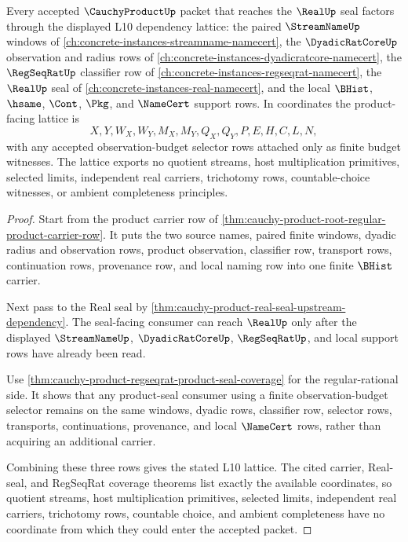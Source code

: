 \begin{theorem}
\label{thm:cauchy-product-l10-dependency-lattice}
Every accepted $\CauchyProductUp$ packet that reaches the $\RealUp$ seal factors through the displayed L10 dependency lattice: the paired $\StreamNameUp$ windows of \autoref{ch:concrete-instances-streamname-namecert}, the $\DyadicRatCoreUp$ observation and radius rows of \autoref{ch:concrete-instances-dyadicratcore-namecert}, the $\RegSeqRatUp$ classifier row of \autoref{ch:concrete-instances-regseqrat-namecert}, the $\RealUp$ seal of \autoref{ch:concrete-instances-real-namecert}, and the local $\BHist$, $\hsame$, $\Cont$, $\Pkg$, and $\NameCert$ support rows. In coordinates the product-facing lattice is
$$
X,Y,W_X,W_Y,M_X,M_Y,Q_X,Q_Y,P,E,H,C,L,N,
$$
with any accepted observation-budget selector rows attached only as finite budget witnesses. The lattice exports no quotient streams, host multiplication primitives, selected limits, independent real carriers, trichotomy rows, countable-choice witnesses, or ambient completeness principles.
\end{theorem}
\begin{proof}
Start from the product carrier row of \autoref{thm:cauchy-product-root-regular-product-carrier-row}. It puts the two source names, paired finite windows, dyadic radius and observation rows, product observation, classifier row, transport rows, continuation rows, provenance row, and local naming row into one finite $\BHist$ carrier.

Next pass to the Real seal by \autoref{thm:cauchy-product-real-seal-upstream-dependency}. The seal-facing consumer can reach $\RealUp$ only after the displayed $\StreamNameUp$, $\DyadicRatCoreUp$, $\RegSeqRatUp$, and local support rows have already been read.

Use \autoref{thm:cauchy-product-regseqrat-product-seal-coverage} for the regular-rational side. It shows that any product-seal consumer using a finite observation-budget selector remains on the same windows, dyadic rows, classifier row, selector rows, transports, continuations, provenance, and local $\NameCert$ rows, rather than acquiring an additional carrier.

Combining these three rows gives the stated L10 lattice. The cited carrier, Real-seal, and RegSeqRat coverage theorems list exactly the available coordinates, so quotient streams, host multiplication primitives, selected limits, independent real carriers, trichotomy rows, countable choice, and ambient completeness have no coordinate from which they could enter the accepted packet.
\end{proof}
